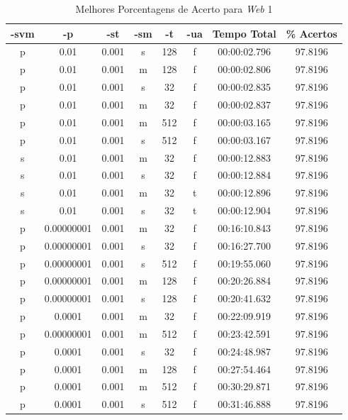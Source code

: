 \begin{table}
    \caption{Melhores Porcentagens de Acerto para \emph{Web} 1}
    \label{tab:bestResults1w1}
    \small
    \centering
    \begin{tabular}{|c|c|c|c|c|c|c|c|} \hline
		-svm & -p & -st & -sm & -t & -ua & Tempo Total & \% Acertos\\ \hline
		p & 0.01 & 0.001 & s & 128 & f & 00:00:02.796 & 97.8196\\ \hline
		p & 0.01 & 0.001 & m & 128 & f & 00:00:02.806 & 97.8196\\ \hline
		p & 0.01 & 0.001 & s & 32 & f & 00:00:02.835 & 97.8196\\ \hline
		p & 0.01 & 0.001 & m & 32 & f & 00:00:02.837 & 97.8196\\ \hline
		p & 0.01 & 0.001 & m & 512 & f & 00:00:03.165 & 97.8196\\ \hline
		p & 0.01 & 0.001 & s & 512 & f & 00:00:03.167 & 97.8196\\ \hline
		s & 0.01 & 0.001 & m & 32 & f & 00:00:12.883 & 97.8196\\ \hline
		s & 0.01 & 0.001 & s & 32 & f & 00:00:12.884 & 97.8196\\ \hline
		s & 0.01 & 0.001 & m & 32 & t & 00:00:12.896 & 97.8196\\ \hline
		s & 0.01 & 0.001 & s & 32 & t & 00:00:12.904 & 97.8196\\ \hline
		p & 0.00000001 & 0.001 & m & 32 & f & 00:16:10.843 & 97.8196\\ \hline
		p & 0.00000001 & 0.001 & s & 32 & f & 00:16:27.700 & 97.8196\\ \hline
		p & 0.00000001 & 0.001 & s & 512 & f & 00:19:55.060 & 97.8196\\ \hline
		p & 0.00000001 & 0.001 & m & 128 & f & 00:20:26.884 & 97.8196\\ \hline
		p & 0.00000001 & 0.001 & s & 128 & f & 00:20:41.632 & 97.8196\\ \hline
		p & 0.0001 & 0.001 & m & 32 & f & 00:22:09.919 & 97.8196\\ \hline
		p & 0.00000001 & 0.001 & m & 512 & f & 00:23:42.591 & 97.8196\\ \hline
		p & 0.0001 & 0.001 & s & 32 & f & 00:24:48.987 & 97.8196\\ \hline
		p & 0.0001 & 0.001 & m & 128 & f & 00:27:54.464 & 97.8196\\ \hline
		p & 0.0001 & 0.001 & m & 512 & f & 00:30:29.871 & 97.8196\\ \hline
		p & 0.0001 & 0.001 & s & 512 & f & 00:31:46.888 & 97.8196\\ \hline

\end{tabular}
\end{table}

